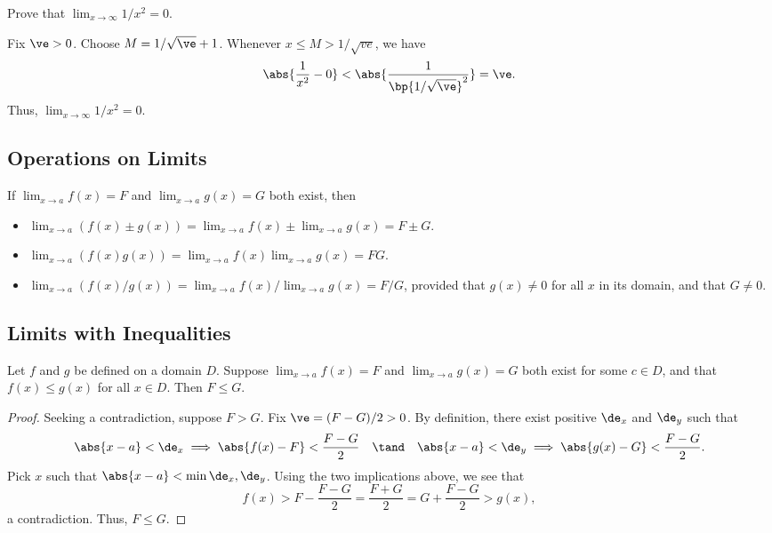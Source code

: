 \begin{sample}
    Prove that $\lim_{x \to \infty} 1/x^2 = 0$.
\end{sample}
\begin{sampans}
    Fix $\ve > 0$. Choose $M = 1/\sqrt{\ve} + 1$. Whenever $x \leq M > 1/\sqrt{ve}$, we have \[\abs{\frac1{x^2} - 0} < \abs{\frac1{\bp{1/\sqrt{\ve}}^2}} = \ve.\] Thus, $\lim_{x \to \infty} 1/x^2 = 0$.
\end{sampans}

\subsection{Operations on Limits}

\begin{fact}
    If $\displaystyle\lim_{x \to a} f(x) = F$ and $\displaystyle\lim_{x \to a} g(x) = G$ both exist, then
    \begin{itemize}
        \item $\displaystyle\lim_{x \to a} (f(x) \pm g(x)) = \lim_{x \to a} f(x) \pm \lim_{x \to a} g(x) = F \pm G$.
        \item $\displaystyle\lim_{x \to a} (f(x) g(x)) = \lim_{x \to a} f(x) \lim_{x \to a} g(x) = FG$.
        \item $\displaystyle\lim_{x \to a} (f(x)/g(x)) = \lim_{x \to a} f(x) / \lim_{x \to a} g(x) = F/G$, provided that $g(x) \neq 0$ for all $x$ in its domain, and that $G \neq 0$.
    \end{itemize}
\end{fact}

\subsection{Limits with Inequalities}

\begin{proposition}
    Let $f$ and $g$ be defined on a domain $D$. Suppose $\lim_{x \to a} f(x) = F$ and $\lim_{x \to a} g(x) = G$ both exist for some $c \in D$, and that $f(x) \leq g(x)$ for all $x \in D$. Then $F \leq G$.
\end{proposition}
\begin{proof}
    Seeking a contradiction, suppose $F > G$. Fix $\ve = (F-G)/2 > 0$. By definition, there exist positive $\de_x$ and $\de_y$ such that \[\abs{x-a} < \de_x \implies \abs{f(x) - F} < \frac{F-G}{2} \quad \tand \quad \abs{x-a} < \de_y \implies \abs{g(x) - G} < \frac{F-G}{2}.\] Pick $x$ such that $\abs{x - a} < \min{\de_x, \de_y}$. Using the two implications above, we see that \[f(x) > F - \frac{F-G}{2} = \frac{F+G}{2} = G + \frac{F-G}{2} > g(x),\] a contradiction. Thus, $F \leq G$.
\end{proof}

